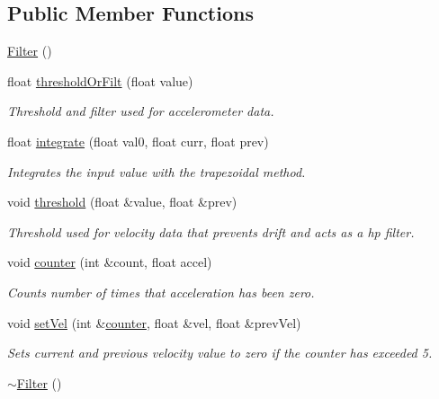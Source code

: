 \subsection*{Public Member Functions}
\begin{DoxyCompactItemize}
\item 
\hyperlink{classFilter_ad15994c30d497afd567a6445446a249e}{Filter} ()
\item 
float \hyperlink{classFilter_a4cf317f524d27d1257dcd1defc55b60d}{threshold\+Or\+Filt} (float value)
\begin{DoxyCompactList}\small\item\em Threshold and filter used for accelerometer data. \end{DoxyCompactList}\item 
float \hyperlink{classFilter_a7cf738197eb1c4db4da770bb3caba0cc}{integrate} (float val0, float curr, float prev)
\begin{DoxyCompactList}\small\item\em Integrates the input value with the trapezoidal method. \end{DoxyCompactList}\item 
void \hyperlink{classFilter_a6a1278398f661776ec6e2d11c527efbd}{threshold} (float \&value, float \&prev)
\begin{DoxyCompactList}\small\item\em Threshold used for velocity data that prevents drift and acts as a hp filter. \end{DoxyCompactList}\item 
void \hyperlink{classFilter_af82d470c92431795b69c0bda29ceb534}{counter} (int \&count, float accel)
\begin{DoxyCompactList}\small\item\em Counts number of times that acceleration has been zero. \end{DoxyCompactList}\item 
void \hyperlink{classFilter_a37eff97b71271134bb8dce35947893d2}{set\+Vel} (int \&\hyperlink{classFilter_af82d470c92431795b69c0bda29ceb534}{counter}, float \&vel, float \&prev\+Vel)
\begin{DoxyCompactList}\small\item\em Sets current and previous velocity value to zero if the counter has exceeded 5. \end{DoxyCompactList}\item 
\hyperlink{classFilter_a502ee334d42eac3edbaf32b599f9c35e}{$\sim$\+Filter} ()
\end{DoxyCompactItemize}


